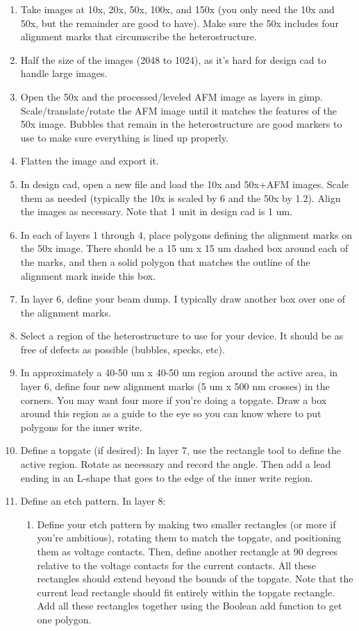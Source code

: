 \begin{appendices}
\begin{enumerate}
	\item Take images at 10x, 20x, 50x, 100x, and 150x (you only need the 10x and 50x, but the remainder are good to have). Make sure the 50x includes four alignment marks that circumscribe the heterostructure.
	\item Half the size of the images (2048 to 1024), as it’s hard for design cad to handle large images.
	\item Open the 50x and the processed/leveled AFM image as layers in gimp. Scale/translate/rotate the AFM image until it matches the features of the 50x image. Bubbles that remain in the heterostructure are good markers to use to make sure everything is lined up properly.
	\item Flatten the image and export it.
	\item In design cad, open a new file and load the 10x and 50x+AFM images. Scale them as needed (typically the 10x is scaled by 6 and the 50x by 1.2). Align the images as necessary. Note that 1 unit in design cad is 1 um.
	\item In each of layers 1 through 4, place polygons defining the alignment marks on the 50x image. There should be a 15 um x 15 um dashed box around each of the marks, and then a solid polygon that matches the outline of the alignment mark inside this box.
	\item In layer 6, define your beam dump. I typically draw another box over one of the alignment marks.
	\item Select a region of the heterostructure to use for your device. It should be as free of defects as possible (bubbles, specks, etc).
	\item In approximately a 40-50 um x 40-50 um region around the active area, in layer 6, define four new alignment marks (5 um x 500 nm crosses) in the corners.  You may want four more if you’re doing a topgate. Draw a box around this region as a guide to the eye so you can know where to put polygons for the inner write.
	\item Define a topgate (if desired): In layer 7, use the rectangle tool to define the active region. Rotate as necessary and record the angle. Then add a lead ending in an L-shape that goes to the edge of the inner write region.
	\item Define an etch pattern. In layer 8:
	\begin{enumerate}
		\item Define your etch pattern by making two smaller rectangles (or more if you’re ambitious), rotating them to match the topgate, and positioning them as voltage contacts. Then, define another rectangle at 90 degrees relative to the voltage contacts for the current contacts. All these rectangles should extend beyond the bounds of the topgate. Note that the current lead rectangle should fit entirely within the topgate rectangle. Add all these rectangles together using the Boolean add function to get one polygon.

\end{enumerate}
\end{enumerate}
\end{appendices}
